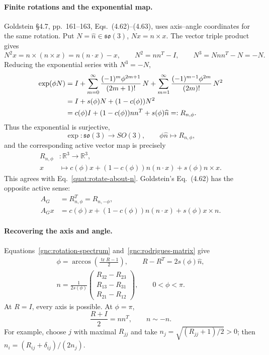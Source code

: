 \paragraph{Finite rotations and the exponential map.}
Goldstein \S4.7, pp.~161--163, Eqs.~(4.62)--(4.63), uses axis--angle
coordinates for the same rotation. Put $N=\widehat n\in\mathfrak{so}(3)$,
$Nx=n\times x$. The vector triple product gives
\[
 N^2x=n\times(n\times x)=n(n\cdot x)-x,\qquad
 N^2=nn^T-I,\qquad N^3=Nnn^T-N=-N.
\]
Reducing the exponential series with $N^3=-N$,
\begin{align}
 \exp(\phi N)
 &=I+\sum_{m=0}^{\infty}\frac{(-1)^m\phi^{2m+1}}{(2m+1)!}\,N
    +\sum_{m=1}^{\infty}\frac{(-1)^{m-1}\phi^{2m}}{(2m)!}\,N^2\notag\\
 &=I+s(\phi)N+(1-c(\phi))N^2\notag\\
 &=c(\phi)I+(1-c(\phi))nn^T+s(\phi)\widehat n
 =:R_{n,\phi}.\label{gnc:rodrigues-matrix}
\end{align}
Thus the exponential is surjective,
\[
 \exp\colon\mathfrak{so}(3)\longrightarrow SO(3),\qquad
 \phi\widehat n\longmapsto R_{n,\phi},
\]
and the corresponding active vector map is precisely
\begin{equation}\label{gnc:finite-vector-map}
 \begin{aligned}
 R_{n,\phi}&\colon\mathbb R^3\longrightarrow\mathbb R^3,\\
 x&\longmapsto c(\phi)x+(1-c(\phi))n(n\cdot x)+s(\phi)n\times x.
 \end{aligned}
\end{equation}
This agrees with Eq.~\eqref{quat:rotate-about-n}.
Goldstein's Eq.~(4.62) has the opposite active sense:
\begin{equation}\label{gnc:goldstein-finite-dictionary}
 \begin{aligned}
 A_G&=R_{n,\phi}^T=R_{n,-\phi},\\
 A_Gx&=c(\phi)x+(1-c(\phi))n(n\cdot x)+s(\phi)x\times n.
 \end{aligned}
\end{equation}

\paragraph{Recovering the axis and angle.}
Equations~\eqref{gnc:rotation-spectrum} and~\eqref{gnc:rodrigues-matrix}
give
\begin{equation}\label{gnc:axis-angle-recovery}
 \begin{gathered}
 \phi=\arccos\!\left(\frac{\operatorname{tr}R-1}{2}\right),\qquad
 R-R^T=2s(\phi)\widehat n,\\
 n=\frac1{2s(\phi)}\begin{pmatrix}R_{32}-R_{23}\\R_{13}-R_{31}\\R_{21}-R_{12}\end{pmatrix},
 \qquad 0<\phi<\pi.
 \end{gathered}
\end{equation}
At $R=I$, every axis is possible. At $\phi=\pi$,
\[
 \frac{R+I}{2}=nn^T,\qquad n\sim-n.
\]
For example, choose $j$ with maximal $R_{jj}$ and take
$n_j=\sqrt{(R_{jj}+1)/2}>0$; then
$n_i=(R_{ij}+\delta_{ij})/(2n_j)$.

